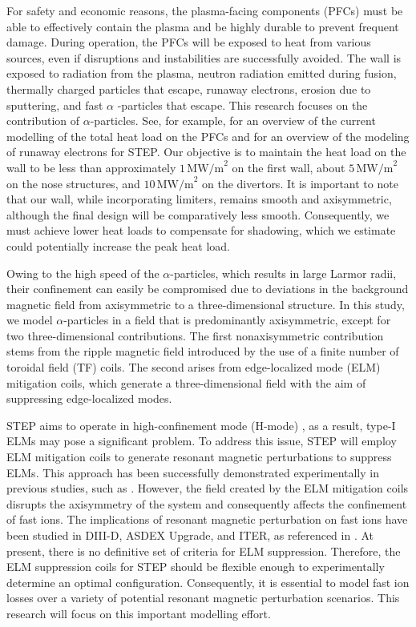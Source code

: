 \documentclass[10pt, a4paper, twoside]{article}
\begin{document}
For safety and economic reasons, the plasma-facing components (PFCs) must be able to effectively contain the plasma and be highly durable to prevent frequent damage. During operation, the PFCs will be exposed to heat from various sources, even if disruptions and instabilities are successfully avoided. The wall is exposed to radiation from the plasma, neutron radiation emitted during fusion, thermally charged particles that escape, runaway electrons, erosion due to sputtering, and fast $\alpha$ -particles that escape. This research focuses on the contribution of $\alpha$-particles. See, for example, \cite{zsolt2023} for an overview of the current modelling of the total heat load on the PFCs and \cite{fil2023} for an overview of the modeling of runaway electrons for STEP. Our objective is to maintain the heat load on the wall to be less than approximately $1\, \text{MW/m}^2$ on the first wall, about $5\, \text{MW/m}^2$ on the nose structures, and $10\, \text{MW/m}^2$ on the divertors. It is important to note that our wall, while incorporating limiters, remains smooth and axisymmetric, although the final design will be comparatively less smooth. Consequently, we must achieve lower heat loads to compensate for shadowing, which we estimate could potentially increase the peak heat load.

Owing to the high speed of the $\alpha$-particles, which results in large Larmor radii, their confinement can easily be compromised due to deviations in the background magnetic field from axisymmetric to a three-dimensional structure.  In this study, we model $\alpha$-particles in a field that is predominantly axisymmetric, except for two three-dimensional contributions. The first nonaxisymmetric contribution stems from the ripple magnetic field introduced by the use of a finite number of toroidal field (TF) coils. The second arises from edge-localized mode (ELM) \cite{zohm1996} mitigation coils, which generate a three-dimensional field with the aim of suppressing edge-localized modes.

STEP aims to operate in high-confinement mode (H-mode) \cite{wagner1982}, as a result, type-I ELMs may pose a significant problem. To address this issue, STEP will employ ELM mitigation coils to generate resonant magnetic perturbations to suppress ELMs. This approach has been successfully demonstrated experimentally in previous studies, such as \cite{suttrop2018}. However, the field created by the ELM mitigation coils disrupts the axisymmetry of the system and consequently affects the confinement of fast ions. The implications of resonant magnetic perturbation on fast ions have been studied in DIII-D, ASDEX Upgrade, and ITER, as referenced in \cite{van2015,sanchis2018,ward2022}. At present, there is no definitive set of criteria for ELM suppression. Therefore, the ELM suppression coils for STEP should be flexible enough to experimentally determine an optimal configuration. Consequently, it is essential to model fast ion losses over a variety of potential resonant magnetic perturbation scenarios. This research will focus on this important modelling effort.
\end{document}
